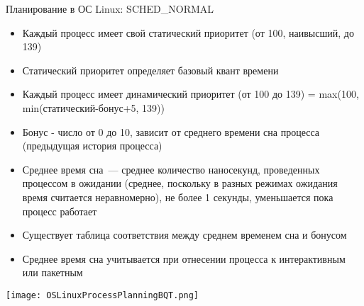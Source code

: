 \documentclass[aspectratio=169,14pt]{beamer}
\begin{document}
\begin{frame}{Планирование в ОС Linux: SCHED\_NORMAL}
    \begin{footnotesize}
    \begin{spacing}{0.9}
    \begin{itemize}
        \item Каждый процесс имеет свой статический приоритет (от 100,
        наивысший, до 139)
        \item Статический приоритет определяет базовый квант времени
        \item Каждый процесс имеет динамический приоритет (от 100 до 139)
         = max(100, min(статический-бонус+5, 139))
        \item Бонус - число от 0 до 10, зависит от среднего времени сна
        процесса (предыдущая история процесса)
        \item Среднее время сна~--- среднее количество наносекунд,
        проведенных процессом в ожидании (среднее, поскольку в разных
        режимах ожидания время считается неравномерно), не более 1 секунды,
        уменьшается пока процесс работает
        \item Существует таблица соответствия между среднем временем сна
        и бонусом
        \item Среднее время сна учитывается при отнесении процесса к
        интерактивным или пакетным
    \end{itemize}
    \end{spacing}
    \end{footnotesize}
    \texttt{[image: OSLinuxProcessPlanningBQT.png]}
\end{frame}
\end{document}
